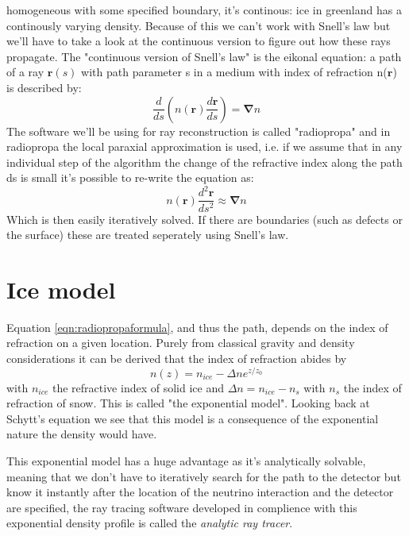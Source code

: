 \documentclass[11pt,a4paper,faculty=we,language=en,doctype=report]{cls/ugent-doc}
\begin{document}
homogeneous with some specified boundary, it's continous: ice
in greenland has a continously varying density. 
Because of this we can't work with Snell's law but we'll have to 
take a look at the continuous version
to figure out how these rays propagate. 
The "continuous version of Snell's law" is the eikonal equation:
a path of a ray $\mathbf{r}(s)$ with path parameter s in a medium
with index of refraction n($\mathbf{r}$) is described by:
\begin{equation}
	\frac{d}{ds}\left(n(\mathbf{r})\frac{d\mathbf{r}}{ds}\right) = \mathbf{\nabla} n
\end{equation}
The software we'll be using for ray reconstruction is called
"radiopropa" \cite{Winchen_2019} and in radiopropa the
local paraxial approximation is used, i.e. if we assume that in any
individual step of the algorithm the change of the refractive index
along the path ds is small it's possible to
re-write the equation as:
\begin{equation}
	n(\mathbf{r})\frac{d^2\mathbf{r}}{ds^2} \approx \mathbf{\nabla} n
	\label{eqn:radiopropaformula}
\end{equation}
Which is then easily iteratively solved.
If there are boundaries (such as defects or the surface)
these are treated seperately using Snell's law. 
\section{Ice model}
\label{section:Ice Model}
Equation \ref{eqn:radiopropaformula}, and thus the path, depends 
on the index of refraction on a given location. 
Purely from classical gravity and density considerations
it can be derived that the index of refraction abides by
\begin{equation}
	n(z) = n_{ice} - \Delta n e^{z/z_0}
\end{equation}
with $n_{ice}$ the refractive index of solid ice and $\Delta n = n_{ice} - n_s$
with $n_s$ the index of refraction of snow. This is called "the exponential
model".  Looking back at Schytt's equation we see that this model is a
consequence of the exponential nature the density would have.

This exponential model has a huge advantage as it's analytically 
solvable, meaning that we don't have to iteratively search for the 
path to the detector but know it instantly after the location of
the neutrino interaction and the detector are specified, the ray 
tracing software developed in complience with this exponential density
profile is called the \textit{analytic ray tracer}.
\end{document}
